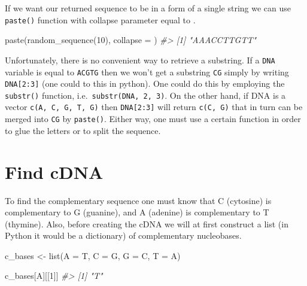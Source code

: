 \documentclass[
]{book}
\newenvironment{Shaded}{\begin{snugshade}}{\end{snugshade}}
\newcommand{\AttributeTok}[1]{\textcolor[rgb]{0.77,0.63,0.00}{#1}}
\newcommand{\CommentTok}[1]{\textcolor[rgb]{0.56,0.35,0.01}{\textit{#1}}}
\newcommand{\DecValTok}[1]{\textcolor[rgb]{0.00,0.00,0.81}{#1}}
\newcommand{\FunctionTok}[1]{\textcolor[rgb]{0.00,0.00,0.00}{#1}}
\newcommand{\NormalTok}[1]{#1}
\newcommand{\OtherTok}[1]{\textcolor[rgb]{0.56,0.35,0.01}{#1}}
\newcommand{\StringTok}[1]{\textcolor[rgb]{0.31,0.60,0.02}{#1}}
\begin{document}
If we want our returned sequence to be in a form of a single string we can use \texttt{paste()} function with collapse parameter equal to \texttt{\textquotesingle{}\textquotesingle{}}.

\begin{Shaded}
\begin{Highlighting}[]
\FunctionTok{paste}\NormalTok{(}\FunctionTok{random\_sequence}\NormalTok{(}\DecValTok{10}\NormalTok{), }\AttributeTok{collapse =} \StringTok{\textquotesingle{}\textquotesingle{}}\NormalTok{)}
\CommentTok{\#\textgreater{} [1] "AAACCTTGTT"}
\end{Highlighting}
\end{Shaded}

Unfortunately, there is no convenient way to retrieve a substring. If a \texttt{DNA} variable is equal to \texttt{\textquotesingle{}ACGTG\textquotesingle{}} then we won't get a substring \texttt{\textquotesingle{}CG\textquotesingle{}} simply by writing \texttt{DNA{[}2:3{]}} (one could to this in python). One could do this by employing the \texttt{substr()} function, i.e.~\texttt{substr(DNA,\ 2,\ 3)}. On the other hand, if DNA is a vector \texttt{c(\textquotesingle{}A\textquotesingle{},\ \textquotesingle{}C\textquotesingle{},\ \textquotesingle{}G\textquotesingle{},\ \textquotesingle{}T\textquotesingle{},\ \textquotesingle{}G\textquotesingle{})} then \texttt{DNA{[}2:3{]}} will return \texttt{c(\textquotesingle{}C\textquotesingle{},\ \textquotesingle{}G\textquotesingle{})} that in turn can be merged into \texttt{\textquotesingle{}CG\textquotesingle{}} by \texttt{paste()}. Either way, one must use a certain function in order to glue the letters or to split the sequence.

\hypertarget{find-cdna}{%
\section{Find cDNA}\label{find-cdna}}

To find the complementary sequence one must know that C (cytosine) is complementary to G (guanine), and A (adenine) is complementary to T (thymine). Also, before creating the cDNA we will at first construct a list (in Python it would be a dictionary) of complementary nucleobases.

\begin{Shaded}
\begin{Highlighting}[]
\NormalTok{c\_bases }\OtherTok{\textless{}{-}} \FunctionTok{list}\NormalTok{(}\StringTok{\textquotesingle{}A\textquotesingle{}} \OtherTok{=} \StringTok{\textquotesingle{}T\textquotesingle{}}\NormalTok{, }\StringTok{\textquotesingle{}C\textquotesingle{}} \OtherTok{=} \StringTok{\textquotesingle{}G\textquotesingle{}}\NormalTok{, }\StringTok{\textquotesingle{}G\textquotesingle{}} \OtherTok{=} \StringTok{\textquotesingle{}C\textquotesingle{}}\NormalTok{, }\StringTok{\textquotesingle{}T\textquotesingle{}} \OtherTok{=} \StringTok{\textquotesingle{}A\textquotesingle{}}\NormalTok{)}

\NormalTok{c\_bases[}\StringTok{\textquotesingle{}A\textquotesingle{}}\NormalTok{][[}\DecValTok{1}\NormalTok{]]}
\CommentTok{\#\textgreater{} [1] "T"}
\end{Highlighting}
\end{Shaded}
\end{document}
